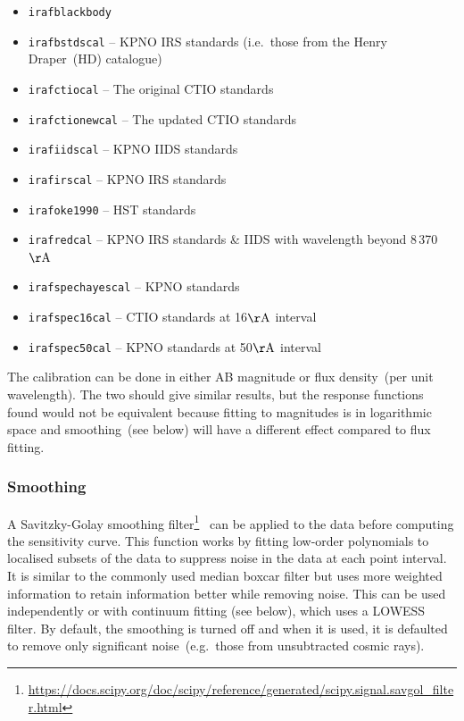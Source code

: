 \documentclass[linenumbers, twocolumn]{aastex631}
\begin{document}
\begin{itemize}
    \item \texttt{irafblackbody}
    \item \texttt{irafbstdscal} -- KPNO IRS standards (i.e.\ those from the Henry Draper~(HD) catalogue)
    \item \texttt{irafctiocal} -- The original CTIO standards \citet{1983MNRAS.204..347S, 1984MNRAS.206..241B}
    \item \texttt{irafctionewcal} -- The updated CTIO standards \citet{1992PASP..104..533H, 1994PASP..106..566H}
    \item \texttt{irafiidscal} -- KPNO IIDS standards \citet{1988ApJ...328..315M}
    \item \texttt{irafirscal} -- KPNO IRS standards \citet{1988ApJ...328..315M}
    \item \texttt{irafoke1990} -- HST standards \citet{1990AJ.....99.1621O}
    \item \texttt{irafredcal} -- KPNO IRS standards \& IIDS \citet{1988ApJ...328..315M} with wavelength beyond 8\,370\,$\mathrm{\AA}$
    \item \texttt{irafspechayescal} -- KPNO standards \citet{1988ApJ...328..315M}
    \item \texttt{irafspec16cal} -- CTIO standards \citet{1992PASP..104..533H, 1994PASP..106..566H} at 16$\mathrm{\AA}$ interval
    \item \texttt{irafspec50cal} -- KPNO standards \citet{1988ApJ...328..315M, 1990ApJ...358..344M} at 50$\mathrm{\AA}$ interval
\end{itemize}



The calibration can be done in either AB magnitude or
flux density~(per unit wavelength). The two should give similar
results, but the response functions found would not be equivalent
because fitting to magnitudes is in logarithmic space and smoothing~(see
below) will have a different effect compared to flux fitting.

\subsubsection*{Smoothing}
A Savitzky-Golay smoothing
filter\footnote{\url{https://docs.scipy.org/doc/scipy/reference/generated/scipy.signal.savgol_filter.html}}~\citep[hereafter, SG-filter]{1964AnaCh..36.1627S}
can be applied to the data before computing the sensitivity curve. This function
works by fitting low-order polynomials to localised subsets of the data to
suppress noise in the data at each point interval. It is similar to the
commonly used median boxcar filter but uses more weighted information to
retain information better while removing noise. This can be used independently
or with continuum fitting (see below), which uses a LOWESS filter. By default,
the smoothing is turned off and when it is used, it is defaulted to
remove only significant noise~(e.g.\ those from unsubtracted cosmic rays).
\end{document}
